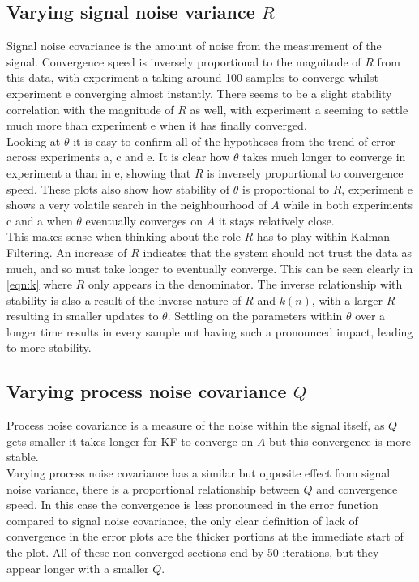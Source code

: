 \documentclass[sigconf]{acmart}
\begin{document}
\subsection{Varying signal noise variance $R$}
Signal noise covariance is the amount of noise from the measurement of the signal. Convergence speed is inversely proportional to the magnitude of $R$ from this data, with experiment a taking around 100 samples to converge whilst experiment e converging almost instantly.
There seems to be a slight stability correlation with the magnitude of $R$ as well, with experiment a seeming to settle much more than experiment e when it has finally converged.\\

Looking at $\theta$ it is easy to confirm all of the hypotheses from the trend of error across experiments a, c and e.
It is clear how $\theta$ takes much longer to converge in experiment a than in e, showing that $R$ is inversely proportional to convergence speed.
These plots also show how stability of $\theta$ is proportional to $R$, experiment e shows a very volatile search in the neighbourhood of $A$ while in both experiments c and a when $\theta$ eventually converges on $A$ it stays relatively close.\\

This makes sense when thinking about the role $R$ has to play within Kalman Filtering. An increase of $R$ indicates that the system should not trust the data as much, and so must take longer to eventually converge. This can be seen clearly in \autoref{eqn:k} where $R$ only appears in the denominator.
The inverse relationship with stability is also a result of the inverse nature of $R$ and $k(n)$, with a larger $R$ resulting in smaller updates to $\theta$. Settling on the parameters within $\theta$ over a longer time results in every sample not having such a pronounced impact, leading to more stability.
\subsection{Varying process noise covariance $Q$} 
Process noise covariance is a measure of the noise within the signal itself, as $Q$ gets smaller it takes longer for KF to converge on $A$ but this convergence is more stable.\\

Varying process noise covariance has a similar but opposite effect from signal noise variance, there is a proportional relationship between $Q$ and convergence speed.
In this case the convergence is less pronounced in the error function compared to signal noise covariance, the only clear definition of lack of convergence in the error plots are the thicker portions at the immediate start of the plot. All of these non-converged sections end by 50 iterations, but they appear longer with a smaller $Q$.\\
\end{document}
